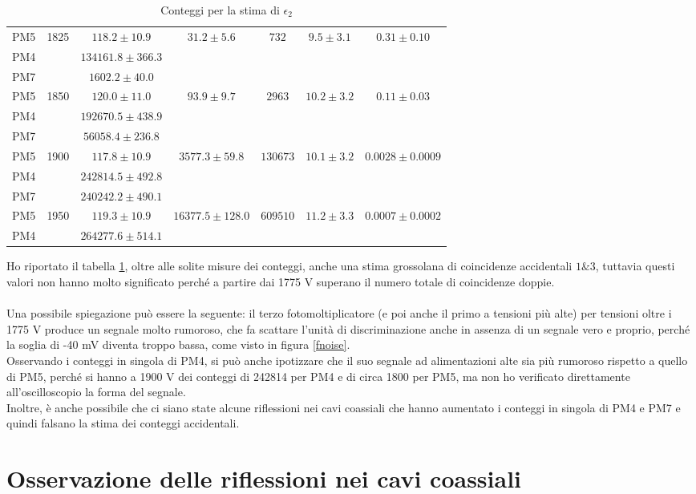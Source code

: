 \documentclass{article}
\begin{document}
\begin{table}[H]
\begin{tabular}{|c|c|c|c|c|c|c|}
PM5 & 1825 & $118.2 \pm 10.9$& $31.2 \pm 5.6$  & $732$ & $9.5 \pm 3.1$& $0.31 \pm 0.10$ \\ 
PM4 & & $134161.8 \pm 366.3$ & & & & \\ 
\hline 
PM7 & & $1602.2 \pm 40.0$ & & & & \\ 
PM5 & 1850 & $120.0 \pm 11.0$& $93.9 \pm 9.7$  & $2963$ & $10.2 \pm 3.2$& $0.11 \pm 0.03$ \\ 
PM4 & & $192670.5 \pm 438.9$ & & & & \\ 
\hline 
PM7 & & $56058.4 \pm 236.8$ & & & & \\ 
PM5 & 1900 & $117.8 \pm 10.9$& $3577.3 \pm 59.8$  & $130673$ & $10.1 \pm 3.2$&  $0.0028 \pm 0.0009$ \\ 
PM4 & & $242814.5 \pm 492.8$ & & & & \\ 
\hline 
PM7 & & $240242.2 \pm 490.1$ & & & & \\ 
PM5 & 1950 & $119.3 \pm 10.9$& $16377.5 \pm 128.0$  & $609510$ & $11.2 \pm 3.3$& $0.0007 \pm 0.0002$ \\ 
PM4 & & $264277.6 \pm 514.1$ & & & & \\ 
\hline
\end{tabular}
\caption{Conteggi per la stima di $\epsilon_2$}\label{tabacc}
\end{table}

Ho riportato il tabella \ref{tabacc}, oltre alle solite misure dei conteggi, anche una stima grossolana di coincidenze accidentali $1\&3$, tuttavia questi valori non hanno molto significato perché a partire dai 1775 V superano il numero totale di coincidenze doppie. 
\\
\\
Una possibile spiegazione può essere la seguente: il terzo fotomoltiplicatore (e poi anche il primo a tensioni più alte) per tensioni oltre i 1775 V produce un segnale molto rumoroso, che fa scattare l'unità di discriminazione anche in assenza di un segnale vero e proprio, perché la soglia di -40 mV diventa troppo bassa, come visto in figura \ref{fnoise}. 
\\
Osservando i conteggi in singola di PM4, si può anche ipotizzare che il suo segnale ad alimentazioni alte sia più rumoroso rispetto a quello di PM5, perché si hanno a 1900 V dei conteggi di 242814 per PM4 e di circa 1800 per PM5, ma non ho verificato direttamente all'oscilloscopio la forma del segnale.
\\
Inoltre, è anche possibile che ci siano state alcune riflessioni nei cavi coassiali che hanno aumentato i conteggi in singola di PM4 e PM7 e quindi falsano la stima dei conteggi accidentali.

\newpage
\section{Osservazione delle riflessioni nei cavi coassiali}
\end{document}

